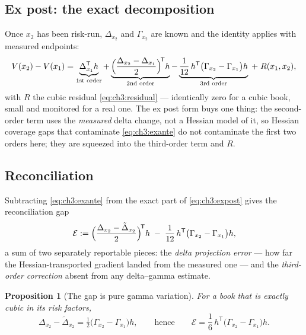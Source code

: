 \documentclass[11pt]{book}
\theoremstyle{plain}
\newtheorem{proposition}[theorem]{Proposition}
\theoremstyle{definition}
\theoremstyle{remark}
\begin{document}
\subsection{Ex post: the exact decomposition}\label{sec:ch3:expost}

Once $x_2$ has been risk-run, $\Delta_{x_2}$ and $\Gamma_{x_2}$ are known and
the identity applies with measured endpoints:
\begin{equation}\label{eq:ch3:expost}
  V(x_2) - V(x_1)
  = \underbrace{\Delta_{x_1}^{\mathsf T} h}_{\text{1st order}}
  + \underbrace{\Bigl(\frac{\Delta_{x_2} -
      \Delta_{x_1}}{2}\Bigr)^{\!\mathsf T} h}_{\text{2nd order}}
  - \underbrace{\frac{1}{12}\, h^{\mathsf T}
      \bigl(\Gamma_{x_2} - \Gamma_{x_1}\bigr) h}_{\text{3rd order}}
  \;+\; R(x_1, x_2),
\end{equation}
with $R$ the cubic residual \eqref{eq:ch3:residual} --- identically zero for
a cubic book, small and monitored for a real one. The ex post form buys one
thing: the second-order term uses the \emph{measured} delta change, not a
Hessian model of it, so Hessian coverage gaps that contaminate
\eqref{eq:ch3:exante} do not contaminate the first two orders here; they are
squeezed into the third-order term and $R$.

\subsection{Reconciliation}\label{sec:ch3:reconciliation}

Subtracting \eqref{eq:ch3:exante} from the exact part of
\eqref{eq:ch3:expost} gives the reconciliation gap
\begin{equation}\label{eq:ch3:reconciliation}
  \mathcal{E}
  := \Bigl(\frac{\Delta_{x_2} -
     \tilde{\Delta}_{x_2}}{2}\Bigr)^{\!\mathsf T} h
   \;-\; \frac{1}{12}\, h^{\mathsf T}
     \bigl(\Gamma_{x_2} - \Gamma_{x_1}\bigr) h ,
\end{equation}
a sum of two separately reportable pieces: the \emph{delta projection error}
--- how far the Hessian-transported gradient landed from the measured one ---
and the \emph{third-order correction} absent from any delta--gamma estimate.

\begin{proposition}[The gap is pure gamma variation]\label{prop:ch3:gap}
For a book that is exactly cubic in its risk factors,
\begin{equation}\label{eq:ch3:gap-collapsed}
  \Delta_{x_2} - \tilde{\Delta}_{x_2}
  = \tfrac{1}{2}\bigl(\Gamma_{x_2} - \Gamma_{x_1}\bigr) h ,
  \qquad\text{hence}\qquad
  \mathcal{E}
  = \frac{1}{6}\, h^{\mathsf T}\bigl(\Gamma_{x_2} - \Gamma_{x_1}\bigr) h .
\end{equation}
\end{proposition}
\end{document}
